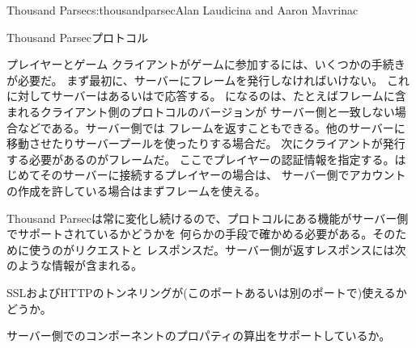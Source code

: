\begin{aosachapter}{Thousand Parsec}{s:thousandparsec}{Alan Laudicina and Aaron Mavrinac}
\begin{aosasect1}{Thousand Parsecプロトコル}
\begin{aosasect2}{プレイヤーとゲーム}
クライアントがゲームに参加するには、いくつかの手続きが必要だ。
まず最初に、サーバーにフレームを発行しなければいけない。
これに対してサーバーはあるいはで応答する。
になるのは、たとえばフレームに含まれるクライアント側のプロトコルのバージョンが
サーバー側と一致しない場合などである。サーバー側では
フレームを返すこともできる。他のサーバーに移動させたりサーバープールを使ったりする場合だ。
次にクライアントが発行する必要があるのがフレームだ。
ここでプレイヤーの認証情報を指定する。はじめてそのサーバーに接続するプレイヤーの場合は、
サーバー側でアカウントの作成を許している場合はまずフレームを使える。

Thousand Parsecは常に変化し続けるので、プロトコルにある機能がサーバー側でサポートされているかどうかを
何らかの手段で確かめる必要がある。そのために使うのがリクエストと
レスポンスだ。サーバー側が返すレスポンスには次のような情報が含まれる。

\begin{aosaitemize}

  \item SSLおよびHTTPのトンネリングが(このポートあるいは別のポートで)使えるかどうか。

  \item サーバー側でのコンポーネントのプロパティの算出をサポートしているか。


\end{aosaitemize}
\end{aosasect2}
\end{aosasect1}
\end{aosachapter}
